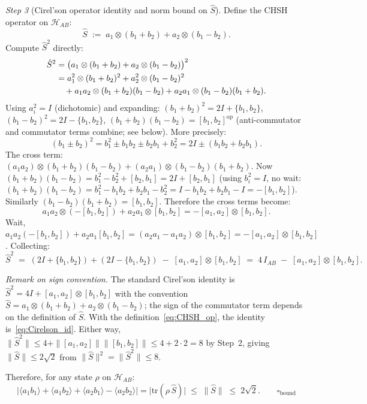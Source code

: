 \documentclass[11pt]{article}
\theoremstyle{remark}
\begin{document}
\begin{tcolorbox}[apfbox, title={$T_{\mathrm{Tsirelson}}$: CHSH Bound from Finite Enforcement Capacity}]
\textit{Step 3} (Cirel'son operator identity and norm bound on $\hat{S}$).  Define the CHSH operator on $\mathcal{H}_{AB}$:
\begin{equation}\label{eq:CHSH_op}
\hat{S} \;:=\; a_1 \otimes (b_1 + b_2) + a_2 \otimes (b_1 - b_2).
\end{equation}
Compute $\hat{S}^2$ directly:
\begin{align}
\hat{S}^2 &= \bigl(a_1\otimes(b_1+b_2) + a_2\otimes(b_1-b_2)\bigr)^2 \notag \\
&= a_1^2\otimes(b_1+b_2)^2 + a_2^2\otimes(b_1-b_2)^2 \notag \\
&\quad + a_1 a_2 \otimes (b_1+b_2)(b_1-b_2) + a_2 a_1\otimes(b_1-b_2)(b_1+b_2). \notag
\end{align}
Using $a_i^2 = I$ (dichotomic) and expanding:
$(b_1+b_2)^2 = 2I + \{b_1,b_2\}$, $(b_1-b_2)^2 = 2I - \{b_1,b_2\}$, $(b_1+b_2)(b_1-b_2) = [b_1,b_2]^{\mathrm{op}}$ (anti-commutator and commutator terms combine; see below).  More precisely:
\[
(b_1\pm b_2)^2 = b_1^2 \pm b_1 b_2 \pm b_2 b_1 + b_2^2 = 2I \pm (b_1 b_2 + b_2 b_1).
\]
The cross term: $(a_1 a_2)\otimes(b_1+b_2)(b_1-b_2) + (a_2 a_1)\otimes(b_1-b_2)(b_1+b_2)$.  Now $(b_1+b_2)(b_1-b_2) = b_1^2 - b_2^2 + [b_2, b_1] = 2I + [b_2,b_1]$ (using $b_i^2 = I$, no wait: $(b_1+b_2)(b_1-b_2) = b_1^2 - b_1 b_2 + b_2 b_1 - b_2^2 = I - b_1 b_2 + b_2 b_1 - I = -[b_1,b_2]$).  Similarly $(b_1-b_2)(b_1+b_2) = [b_1,b_2]$.  Therefore the cross terms become:
\[
a_1 a_2 \otimes(-[b_1,b_2]) + a_2 a_1 \otimes [b_1,b_2] = -[a_1,a_2]\otimes[b_1,b_2].
\]
Wait, $a_1 a_2 (-[b_1,b_2]) + a_2 a_1 [b_1,b_2] = (a_2 a_1 - a_1 a_2)\otimes [b_1,b_2] = -[a_1,a_2]\otimes[b_1,b_2]$.  Collecting:
\begin{equation}\label{eq:Cirelson_id}
\hat{S}^2 \;=\; (2I+\{b_1,b_2\}) + (2I-\{b_1,b_2\}) \;-\; [a_1,a_2]\otimes[b_1,b_2]
\;=\; 4\,I_{AB} \;-\; [a_1,a_2]\otimes[b_1,b_2].
\end{equation}

\noindent\textit{Remark on sign convention.}  The standard Cirel'son identity is $\hat{S}^2 = 4I + [a_1,a_2]\otimes[b_1,b_2]$ with the convention $\hat{S} = a_1\otimes(b_1+b_2) + a_2\otimes(b_1-b_2)$; the sign of the commutator term depends on the definition of $\hat{S}$.  With the definition~\eqref{eq:CHSH_op}, the identity is~\eqref{eq:Cirelson_id}.  Either way, $\|\hat{S}^2\| \le 4 + \|[a_1,a_2]\|\|[b_1,b_2]\| \le 4 + 2\cdot 2 = 8$ by Step~2, giving $\|\hat{S}\| \le 2\sqrt{2}$ from $\|\hat{S}\|^2 = \|\hat{S}^2\| \le 8$.

Therefore, for any state $\rho$ on $\mathcal{H}_{AB}$:
\[
\bigl|\langle a_1 b_1\rangle + \langle a_1 b_2\rangle + \langle a_2 b_1\rangle - \langle a_2 b_2\rangle\bigr|
= \bigl|\mathrm{tr}(\rho\, \hat{S})\bigr| \;\le\; \|\hat{S}\| \;\le\; 2\sqrt{2}. \qquad \square_{\mathrm{bound}}
\]


\end{tcolorbox}
\end{document}
